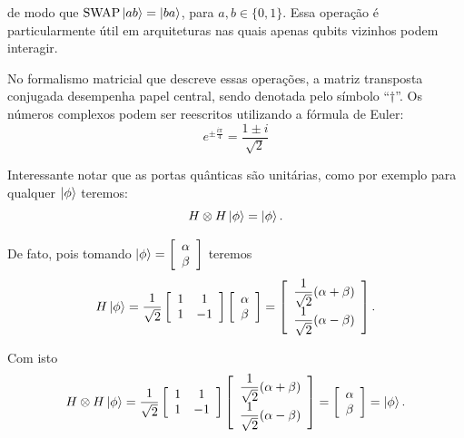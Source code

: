 \noindent de modo que $\mathrm{SWAP}\ket{ab}=\ket{ba}$, para $a,b\in\{0,1\}$. Essa operação é particularmente útil em arquiteturas nas quais apenas qubits vizinhos podem interagir.

No formalismo matricial que descreve essas operações, a matriz transposta conjugada desempenha papel central, sendo denotada pelo símbolo ``$\dagger$''. Os números complexos podem ser reescritos utilizando a fórmula de Euler:
    $$
        e^{\pm\frac{i\pi}{4}} = \dfrac{1\pm i}{\sqrt{2}}
    $$
    
Interessante notar que as portas quânticas são unitárias, como por exemplo para qualquer $\ket{\phi}$ teremos:
    $$
        H\otimes H\ket{\phi} = \ket{\phi}.
    $$
    
De fato, pois tomando $\ket{\phi}=\left[\begin{array}{c}
         \alpha \\
         \beta
    \end{array}\right]$ teremos
    $$
        H\ket{\phi}= \dfrac{1}{\sqrt{2}} \left[\begin{array}{cc}
             1 & 1 \\
             1 & -1
        \end{array}\right]\left[\begin{array}{c}
             \alpha \\
             \beta
        \end{array}\right] = \left[\begin{array}{c}
             \dfrac{1}{\sqrt{2}}(\alpha+\beta) \\
             \dfrac{1}{\sqrt{2}}(\alpha - \beta)
        \end{array}\right].
    $$
    
    Com isto
    $$
        H\otimes H\ket{\phi}= \dfrac{1}{\sqrt{2}}\left[\begin{array}{cc}
             1 & 1 \\
             1 & -1 
        \end{array}\right]\left[\begin{array}{c}
             \dfrac{1}{\sqrt{2}}(\alpha+\beta) \\
             \dfrac{1}{\sqrt{2}}(\alpha - \beta)
        \end{array}\right] = \left[\begin{array}{c}
             \alpha \\
             \beta 
        \end{array}\right]=\ket{\phi}.
    $$
    
